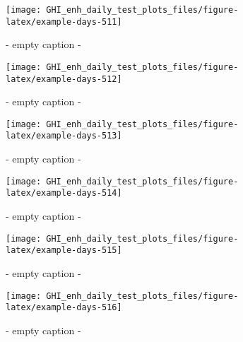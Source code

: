 \documentclass[
  10pt,
  a4paper,oneside]{article}
\begin{document}
\begin{figure}[H]

{\centering \texttt{[image: GHI\_enh\_daily\_test\_plots\_files/figure-latex/example-days-511]} 

}

\caption{ - empty caption - }\label{fig:example-days-511}
\end{figure}

\begin{figure}[H]

{\centering \texttt{[image: GHI\_enh\_daily\_test\_plots\_files/figure-latex/example-days-512]} 

}

\caption{ - empty caption - }\label{fig:example-days-512}
\end{figure}

\begin{figure}[H]

{\centering \texttt{[image: GHI\_enh\_daily\_test\_plots\_files/figure-latex/example-days-513]} 

}

\caption{ - empty caption - }\label{fig:example-days-513}
\end{figure}

\begin{figure}[H]

{\centering \texttt{[image: GHI\_enh\_daily\_test\_plots\_files/figure-latex/example-days-514]} 

}

\caption{ - empty caption - }\label{fig:example-days-514}
\end{figure}

\begin{figure}[H]

{\centering \texttt{[image: GHI\_enh\_daily\_test\_plots\_files/figure-latex/example-days-515]} 

}

\caption{ - empty caption - }\label{fig:example-days-515}
\end{figure}

\begin{figure}[H]

{\centering \texttt{[image: GHI\_enh\_daily\_test\_plots\_files/figure-latex/example-days-516]} 

}

\caption{ - empty caption - }\label{fig:example-days-516}
\end{figure}
\end{document}
